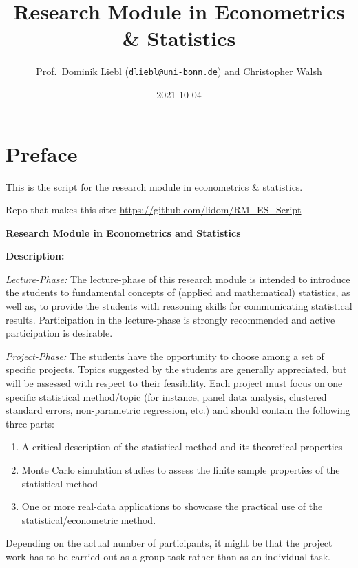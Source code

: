 \documentclass[
]{book}
\title{Research Module in Econometrics \& Statistics}
\author{Prof.~Dominik Liebl (\href{mailto:dliebl@uni-bonn.de}{\nolinkurl{dliebl@uni-bonn.de}}) and Christopher Walsh}
\date{2021-10-04}
\providecommand{\tightlist}{%
  \setlength{\itemsep}{0pt}\setlength{\parskip}{0pt}}
\begin{document}
\maketitle

{
\setcounter{tocdepth}{1}
\tableofcontents
}
\hypertarget{preface}{%
\chapter*{Preface}\label{preface}}

This is the script for the research module in econometrics \& statistics.

Repo that makes this site: \url{https://github.com/lidom/RM_ES_Script}

\textbf{Research Module in Econometrics and Statistics}

\textbf{Description:}

\emph{Lecture-Phase:} The lecture-phase of this research module is intended to introduce the students to fundamental concepts of (applied and mathematical) statistics, as well as, to provide the students with reasoning skills for communicating statistical results. Participation in the lecture-phase is strongly recommended and active participation is desirable.

\emph{Project-Phase:} The students have the opportunity to choose among a set of specific projects. Topics suggested by the students are generally appreciated, but will be assessed with respect to their feasibility. Each project must focus on one specific statistical method/topic (for instance, panel data analysis, clustered standard errors, non-parametric regression, etc.) and should contain the following three parts:

\begin{enumerate}
\def\labelenumi{\arabic{enumi}.}
\tightlist
\item
  A critical description of the statistical method and its theoretical properties
\item
  Monte Carlo simulation studies to assess the finite sample properties of the statistical method
\item
  One or more real-data applications to showcase the practical use of the statistical/econometric method.
\end{enumerate}

Depending on the actual number of participants, it might be that the project work has to be carried out as a group task rather than as an individual task.
\end{document}
